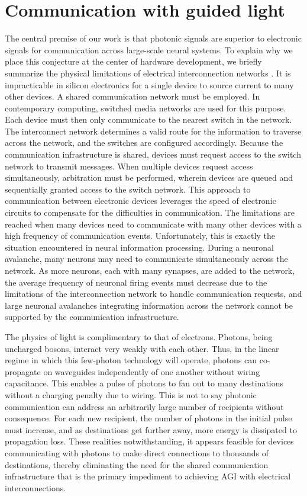 \documentclass[twocolumn]{article}
\begin{document}
\section{\label{sec:communication}Communication with guided light}
The central premise of our work is that photonic signals are superior to electronic signals for communication across large-scale neural systems. To explain why we place this conjecture at the center of hardware development, we briefly summarize the physical limitations of electrical interconnection networks \cite{hepa2012}. It is impracticable in silicon electronics for a single device to source current to many other devices. A shared communication network must be employed. In contemporary computing, switched media networks are used for this purpose. Each device must then only communicate to the nearest switch in the network. The interconnect network determines a valid route for the information to traverse across the network, and the switches are configured accordingly. Because the communication infrastructure is shared, devices must request access to the switch network to transmit messages. When multiple devices request access simultaneously, arbitration must be performed, wherein devices are queued and sequentially granted access to the switch network. This approach to communication between electronic devices leverages the speed of electronic circuits to compensate for the difficulties in communication. The limitations are reached when many devices need to communicate with many other devices with a high frequency of communication events. Unfortunately, this is exactly the situation encountered in neural information processing. During a neuronal avalanche, many neurons may need to communicate simultaneously across the network. As more neurons, each with many synapses, are added to the network, the average frequency of neuronal firing events must decrease due to the limitations of the interconnection network to handle communication requests, and large neuronal avalanches integrating information across the network cannot be supported by the communication infrastructure.

The physics of light is complimentary to that of electrons. Photons, being uncharged bosons, interact very weakly with each other. Thus, in the linear regime in which this few-photon technology will operate, photons can co-propagate on waveguides independently of one another without wiring capacitance. This enables a pulse of photons to fan out to many destinations without a charging penalty due to wiring. This is not to say photonic communication can address an arbitrarily large number of recipients without consequence. For each new recipient, the number of photons in the initial pulse must increase, and as destinations get further away, more energy is dissipated to propagation loss. These realities notwithstanding, it appears feasible for devices communicating with photons to make direct connections to thousands of destinations, thereby eliminating the need for the shared communication infrastructure that is the primary impediment to achieving AGI with electrical interconnections.
\end{document}

